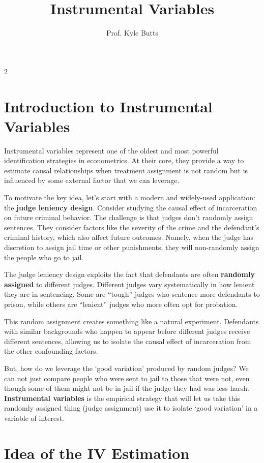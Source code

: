 \documentclass[12pt]{article}
\title{Instrumental Variables}
\author{Prof. Kyle Butts}
\date{}
\begin{document}
\maketitle
\begin{multicols}{2}

\section*{Introduction to Instrumental Variables}

Instrumental variables represent one of the oldest and most powerful identification strategies in econometrics.
At their core, they provide a way to estimate causal relationships when treatment assignment is not random but is influenced by some external factor that we can leverage.

To motivate the key idea, let's start with a modern and widely-used application: the \textbf{judge leniency design}.
Consider studying the causal effect of incarceration on future criminal behavior.
The challenge is that judges don't randomly assign sentences. 
They consider factors like the severity of the crime and the defendant's criminal history, which also affect future outcomes. 
Namely, when the judge has discretion to assign jail time or other punishments, they will non-randomly assign the people who go to jail.

The judge leniency design exploits the fact that defendants are often \textbf{randomly assigned} to different judges.
Different judges vary systematically in how lenient they are in sentencing.
Some are ``tough'' judges who sentence more defendants to prison, while others are ``lenient'' judges who more often opt for probation.

This random assignment creates something like a natural experiment.
Defendants with similar backgrounds who happen to appear before different judges receive different sentences, allowing us to isolate the causal effect of incarceration from the other confounding factors.

But, how do we leverage the `good variation' produced by random judges? 
We can not just compare people who were sent to jail to those that were not, even though some of them might not be in jail if the judge they had was less harsh.
\textbf{Instrumental variables} is the empirical strategy that will let us take this randomly assigned thing (judge assignment) use it to isolate `good variation' in a variable of interest.

\section*{Idea of the IV Estimation}


\end{multicols}
\end{document}
